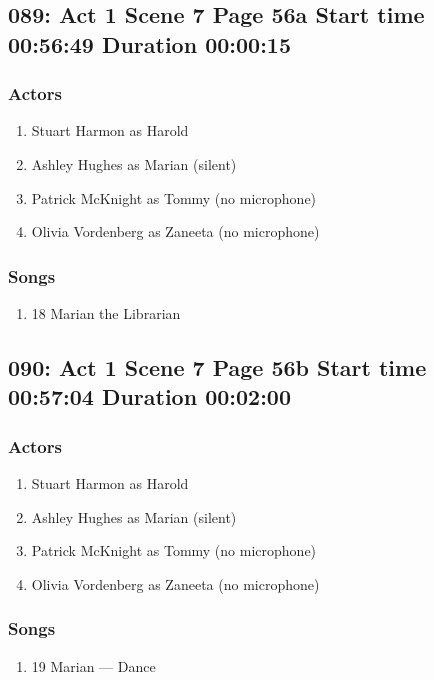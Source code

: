 \subsection{089: Act 1 Scene 7 Page 56a Start time 00:56:49 Duration 00:00:15}

\subsubsection{Actors}
\begin{enumerate}
\item Stuart Harmon as Harold
\item Ashley Hughes as Marian (silent)
\item Patrick McKnight as Tommy (no microphone)
\item Olivia Vordenberg as Zaneeta (no microphone)
\end{enumerate}

\subsubsection{Songs}
\begin{enumerate}
\item 18 Marian the Librarian
\end{enumerate}
\subsection{090: Act 1 Scene 7 Page 56b Start time 00:57:04 Duration 00:02:00}

\subsubsection{Actors}
\begin{enumerate}
\item Stuart Harmon as Harold
\item Ashley Hughes as Marian (silent)
\item Patrick McKnight as Tommy (no microphone)
\item Olivia Vordenberg as Zaneeta (no microphone)
\end{enumerate}

\subsubsection{Songs}
\begin{enumerate}
\item 19 Marian --- Dance
\end{enumerate}
